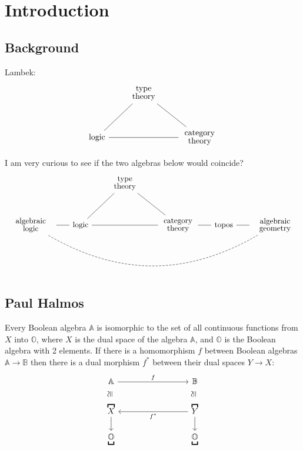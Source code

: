\chapter{Introduction}\label{chap:introduction}

\section{Background}

Lambek:
\begin{equation}
\begin{tikzcd}[row sep=1cm, column sep=0.6cm]
& \parbox{1.5cm}{\linespread{-0.5}\selectfont\centering type theory} \arrow[dl,dash] \arrow[dr,dash] & \\
\mbox{logic} \arrow[rr,dash] & {} & \parbox{1.5cm}{\linespread{-0.5}\selectfont\centering category theory}
\end{tikzcd}
\end{equation}

I am very curious to see if the two algebras below would coincide?
\begin{equation}
\begin{tikzcd}[row sep=1cm, column sep=0.6cm]
 & & \parbox{1.5cm}{\linespread{-0.5}\selectfont\centering type theory} \arrow[dl,dash] \arrow[dr,dash] & & & \\
\parbox{2cm}{\linespread{-0.5}\selectfont\centering algebraic logic} \arrow[rrrrr, dashed, dash, bend right] \arrow[r,dash] & \mbox{logic} \arrow[rr,dash] & {} & \parbox{1.5cm}{\linespread{-0.5}\selectfont\centering category theory} \arrow[r,dash] & \mbox{topos} \arrow[r,dash] & \parbox{2cm}{\linespread{-0.5}\selectfont\centering algebraic geometry}
\end{tikzcd}
\end{equation}

\section{Paul Halmos}

Every Boolean algebra $\mathbb{A}$ is isomorphic to the set of all continuous functions from $X$ into $\mathbb{O}$, where $X$ is the dual space of the algebra $\mathbb{A}$, and $\mathbb{O}$ is the Boolean algebra with 2 elements.  If there is a homomorphism $f$ between Boolean algebras $\mathbb{A} \rightarrow \mathbb{B}$ then there is a dual morphism $f^*$ between their dual spaces $Y \rightarrow X$:
\begin{equation}
\begin{tikzcd}[column sep=3cm, row sep=0.6cm]
\mathbb{A} \arrow[r,"f"] \arrow[d,shift left=2,phantom,"\cong"{anchor=south,rotate=90}] & \mathbb{B} \arrow[d,shift left=2,phantom,"\cong"{anchor=south,rotate=90}] \\
\overbracket{X} \arrow[d] & \overbracket{Y} \arrow[d] \arrow[l,"f^*"] \\
\underbracket{\mathbb{O}} & \underbracket{\mathbb{O}} 
\end{tikzcd}
\end{equation}

